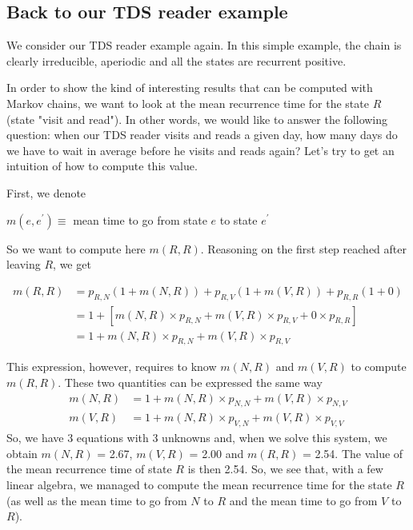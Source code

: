\subsection{Back to our TDS reader example}

We consider our TDS reader example again. In this simple example, the chain is clearly irreducible, aperiodic and all the states are recurrent positive.

In order to show the kind of interesting results that can be computed with Markov chains, we want to look at the mean recurrence time for the state $R$ (state "visit and read"). In other words, we would like to answer the following question: when our TDS reader visits and reads a given day, how many days do we have to wait in average before he visits and reads again? Let's try to get an intuition of how to compute this value.

First, we denote

$m\left(e, e^{\prime}\right) \equiv$ mean time to go from state $e$ to state $e^{\prime}$

So we want to compute here $m(R,R)$. Reasoning on the first step reached after leaving $R$, we get

\begin{equation}\begin{aligned}
m(R, R) &=p_{R, N}(1+m(N, R))+p_{R, V}(1+m(V, R))+p_{R, R}(1+0) \\
&=1+\left[m(N, R) \times p_{R, N}+m(V, R) \times p_{R, V}+0 \times p_{R, R}\right] \\
&=1+m(N, R) \times p_{R, N}+m(V, R) \times p_{R, V}
\end{aligned}\end{equation}

This expression, however, requires to know $m(N,R)$ and $m(V,R)$ to compute $m(R,R)$. These two quantities can be expressed the same way
\begin{equation}\begin{aligned}
m(N, R) &=1+m(N, R) \times p_{N, N}+m(V, R) \times p_{N, V} \\
m(V, R) &=1+m(N, R) \times p_{V, N}+m(V, R) \times p_{V, V}
\end{aligned}\end{equation}
So, we have 3 equations with 3 unknowns and, when we solve this system, we obtain $m(N,R)$ = 2.67, $m(V,R)$ = 2.00 and $m(R,R)$ = 2.54. The value of the mean recurrence time of state $R$ is then 2.54. So, we see that, with a few linear algebra, we managed to compute the mean recurrence time for the state $R$ (as well as the mean time to go from $N$ to $R$ and the mean time to go from $V$ to $R$).

